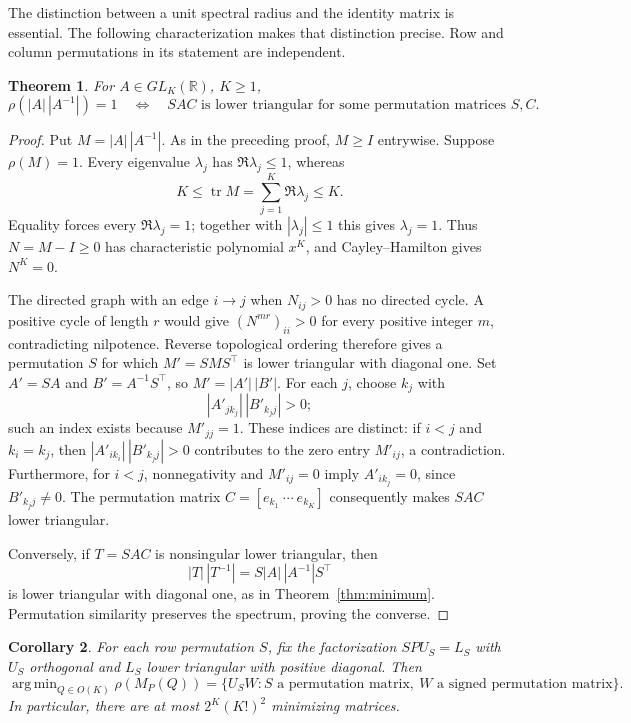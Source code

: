 \documentclass[11pt]{article}
\newtheorem{theorem}{Theorem}
\newtheorem{corollary}[theorem]{Corollary}
\newcommand{\RR}{\mathbb R}
\newcommand{\tr}{\operatorname{tr}}
\DeclareMathOperator*{\argmin}{arg\,min}
\begin{document}
The distinction between a unit spectral radius and the identity matrix
is essential. The following characterization makes that distinction
precise. Row and column permutations in its statement are independent.

\begin{theorem}\label{thm:equality}
For $A\in GL_K(\RR)$, $K\geq1$,
\[
 \rho(|A|\,|A^{-1}|)=1
 \quad\Longleftrightarrow\quad
 SAC\text{ is lower triangular for some permutation matrices }S,C.
\]
\end{theorem}

\begin{proof}
Put $M=|A|\,|A^{-1}|$. As in the preceding proof, $M\geq I$ entrywise.
Suppose $\rho(M)=1$. Every eigenvalue $\lambda_j$ has
$\Re\lambda_j\leq1$, whereas
\[
 K\leq\tr M=\sum_{j=1}^K\Re\lambda_j\leq K.
\]
Equality forces every $\Re\lambda_j=1$; together with $|\lambda_j|\leq1$
this gives $\lambda_j=1$. Thus $N=M-I\geq0$ has characteristic polynomial
$x^K$, and Cayley--Hamilton gives $N^K=0$.

The directed graph with an edge $i\to j$ when $N_{ij}>0$ has no directed
cycle. A positive cycle of length $r$ would give
$(N^{mr})_{ii}>0$ for every positive integer $m$, contradicting
nilpotence. Reverse topological ordering therefore gives a permutation
$S$ for which $M'=SMS^\top$ is lower triangular with diagonal one.
Set $A'=SA$ and $B'=A^{-1}S^\top$, so $M'=|A'|\,|B'|$.
For each $j$, choose $k_j$ with
\[
 |A'_{jk_j}|\,|B'_{k_jj}|>0;
\]
such an index exists because $M'_{jj}=1$.
These indices are distinct: if $i<j$ and $k_i=k_j$, then
$|A'_{ik_i}|\,|B'_{k_jj}|>0$ contributes to the zero entry $M'_{ij}$,
a contradiction. Furthermore, for $i<j$, nonnegativity and
$M'_{ij}=0$ imply $A'_{ik_j}=0$, since $B'_{k_jj}\ne0$.
The permutation matrix $C=[e_{k_1}\ \cdots\ e_{k_K}]$ consequently
makes $SAC$ lower triangular.

Conversely, if $T=SAC$ is nonsingular lower triangular, then
\[
 |T|\,|T^{-1}|=S|A|\,|A^{-1}|S^\top
\]
is lower triangular with diagonal one, as in Theorem~\ref{thm:minimum}.
Permutation similarity preserves the spectrum, proving the converse.
\end{proof}

\begin{corollary}\label{cor:minimizers}
For each row permutation $S$, fix the factorization
$SPU_S=L_S$ with $U_S$ orthogonal and $L_S$ lower triangular with
positive diagonal. Then
\[
 \argmin_{Q\in O(K)}\rho(M_P(Q))
 =\{U_SW:S\text{ a permutation matrix},\ W\text{ a signed permutation matrix}\}.
\]
In particular, there are at most $2^K(K!)^2$ minimizing matrices.
\end{corollary}
\end{document}
